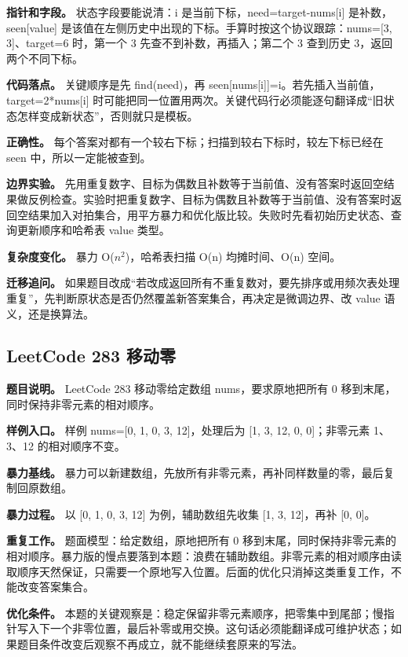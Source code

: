 \textbf{指针和字段。} 状态字段要能说清：i 是当前下标，need=target-nums[i] 是补数，seen[value] 是该值在左侧历史中出现的下标。手算时按这个协议跟踪：nums=[3, 3]、target=6 时，第一个 3 先查不到补数，再插入；第二个 3 查到历史 3，返回两个不同下标。

\textbf{代码落点。} 关键顺序是先 find(need)，再 seen[nums[i]]=i。若先插入当前值，target=2*nums[i] 时可能把同一位置用两次。关键代码行必须能逐句翻译成“旧状态怎样变成新状态”，否则就只是模板。

\textbf{正确性。} 每个答案对都有一个较右下标；扫描到较右下标时，较左下标已经在 seen 中，所以一定能被查到。

\textbf{边界实验。} 先用重复数字、目标为偶数且补数等于当前值、没有答案时返回空结果做反例检查。实验时把重复数字、目标为偶数且补数等于当前值、没有答案时返回空结果加入对拍集合，用平方暴力和优化版比较。失败时先看初始历史状态、查询更新顺序和哈希表 value 类型。

\textbf{复杂度变化。} 暴力 O(\ensuremath{n^{2}})，哈希表扫描 O(n) 均摊时间、O(n) 空间。

\textbf{迁移追问。} 如果题目改成“若改成返回所有不重复数对，要先排序或用频次表处理重复”，先判断原状态是否仍然覆盖新答案集合，再决定是微调边界、改 value 语义，还是换算法。

\subsection{LeetCode 283 移动零}

\textbf{题目说明。} LeetCode 283 移动零给定数组 nums，要求原地把所有 0 移到末尾，同时保持非零元素的相对顺序。

\textbf{样例入口。} 样例 nums=[0, 1, 0, 3, 12]，处理后为 [1, 3, 12, 0, 0]；非零元素 1、3、12 的相对顺序不变。

\textbf{暴力基线。} 暴力可以新建数组，先放所有非零元素，再补同样数量的零，最后复制回原数组。

\textbf{暴力过程。} 以 [0, 1, 0, 3, 12] 为例，辅助数组先收集 [1, 3, 12]，再补 [0, 0]。

\textbf{重复工作。} 题面模型：给定数组，原地把所有 0 移到末尾，同时保持非零元素的相对顺序。暴力版的慢点要落到本题：浪费在辅助数组。非零元素的相对顺序由读取顺序天然保证，只需要一个原地写入位置。后面的优化只消掉这类重复工作，不能改变答案集合。

\textbf{优化条件。} 本题的关键观察是：稳定保留非零元素顺序，把零集中到尾部；慢指针写入下一个非零位置，最后补零或用交换。这句话必须能翻译成可维护状态；如果题目条件改变后观察不再成立，就不能继续套原来的写法。

